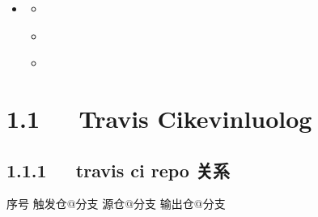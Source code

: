 \documentclass[letterpaper,12pt,english]{sphinxmanual}
\begin{document}
\begin{sphinxShadowBox}
\begin{itemize}
\begin{itemize}
\begin{itemize}
\begin{itemize}
\begin{itemize}
\begin{itemize}
\begin{itemize}
\end{itemize}

\end{itemize}

\end{itemize}

\item {} 
\label{\detokenize{001software/001install/001._u7f51_u7ad9/gitpage:id27}}{\hyperref[\detokenize{001software/001install/001._u7f51_u7ad9/gitpage:id5}]{}}
\begin{itemize}
\item {} 
\label{\detokenize{001software/001install/001._u7f51_u7ad9/gitpage:id28}}{\hyperref[\detokenize{001software/001install/001._u7f51_u7ad9/gitpage:id6}]{}}

\item {} 
\label{\detokenize{001software/001install/001._u7f51_u7ad9/gitpage:id29}}{\hyperref[\detokenize{001software/001install/001._u7f51_u7ad9/gitpage:windown}]{}}

\item {} 
\label{\detokenize{001software/001install/001._u7f51_u7ad9/gitpage:id30}}{\hyperref[\detokenize{001software/001install/001._u7f51_u7ad9/gitpage:travis}]{}}

\end{itemize}

\end{itemize}

\end{itemize}

\end{itemize}

\end{itemize}
\end{sphinxShadowBox}


\section{1.1   Travis Ci\sphinxhyphen{}kevinluolog}
\label{\detokenize{001software/001install/001._u7f51_u7ad9/gitpage:travis-ci-kevinluolog}}

\subsection{1.1.1   travis ci repo 关系}
\label{\detokenize{001software/001install/001._u7f51_u7ad9/gitpage:travis-ci-repo}}
序号  触发仓@分支  源仓@分支  输出仓@分支
\end{document}
